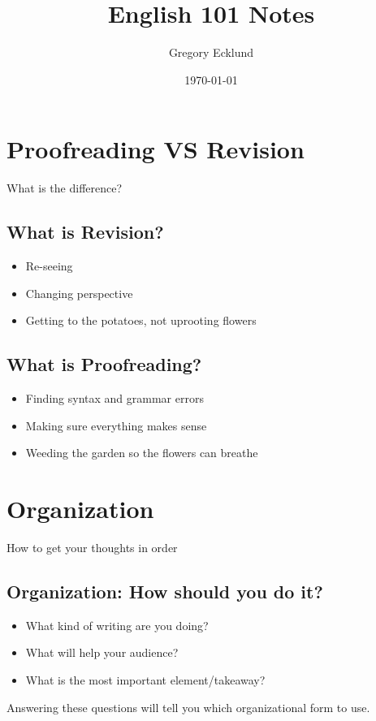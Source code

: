 \documentclass[12pt]{article}
\title{English 101 Notes}
\author{Gregory Ecklund}
\date{\today}
\begin{document}
    \maketitle
    \tableofcontents
    \newpage

    \section{Proofreading VS Revision}
    What is the difference?

    \subsection{What is Revision?}
    \begin{itemize}
        \item Re-seeing
	    \item Changing perspective
	    \item Getting to the potatoes, not uprooting flowers
    \end{itemize}
	
    \subsection{What is Proofreading?}
    \begin{itemize}
        \item Finding syntax and grammar errors
	    \item Making sure everything makes sense
	    \item Weeding the garden so the flowers can breathe
    \end{itemize}

    \section{Organization}
    How to get your thoughts in order

    \subsection{Organization: How should you do it?}
    \begin{itemize}
        \item What kind of writing are you doing?
	\item What will help your audience?
	\item What is the most important element/takeaway?
    \end{itemize}
    Answering these questions will tell you which organizational form to use.
   
\end{document}
